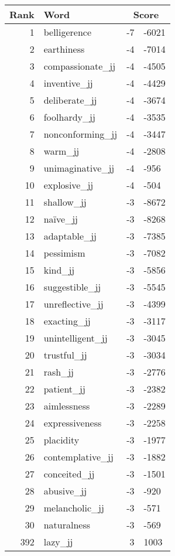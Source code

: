 \begin{longtable}[!htbp]{| rlr@{.}l |}
    \hline
    \textbf{Rank} & \textbf{Word} & \multicolumn{2}{c|}{\textbf{Score}} \\
    \hline
    \endhead
    1 & belligerence & -7 & -6021 \\
    2 & earthiness & -4 & -7014 \\
    3 & compassionate\_jj & -4 & -4505 \\
    4 & inventive\_jj & -4 & -4429 \\
    5 & deliberate\_jj & -4 & -3674 \\
    6 & foolhardy\_jj & -4 & -3535 \\
    7 & nonconforming\_jj & -4 & -3447 \\
    8 & warm\_jj & -4 & -2808 \\
    9 & unimaginative\_jj & -4 & -956 \\
    10 & explosive\_jj & -4 & -504 \\
    11 & shallow\_jj & -3 & -8672 \\
    12 & naïve\_jj & -3 & -8268 \\
    13 & adaptable\_jj & -3 & -7385 \\
    14 & pessimism & -3 & -7082 \\
    15 & kind\_jj & -3 & -5856 \\
    16 & suggestible\_jj & -3 & -5545 \\
    17 & unreflective\_jj & -3 & -4399 \\
    18 & exacting\_jj & -3 & -3117 \\
    19 & unintelligent\_jj & -3 & -3045 \\
    20 & trustful\_jj & -3 & -3034 \\
    21 & rash\_jj & -3 & -2776 \\
    22 & patient\_jj & -3 & -2382 \\
    23 & aimlessness & -3 & -2289 \\
    24 & expressiveness & -3 & -2258 \\
    25 & placidity & -3 & -1977 \\
    26 & contemplative\_jj & -3 & -1882 \\
    27 & conceited\_jj & -3 & -1501 \\
    28 & abusive\_jj & -3 & -920 \\
    29 & melancholic\_jj & -3 & -571 \\
    30 & naturalness & -3 & -569 \\
    392 & lazy\_jj & 3 & 1003 \\

\end{longtable}
